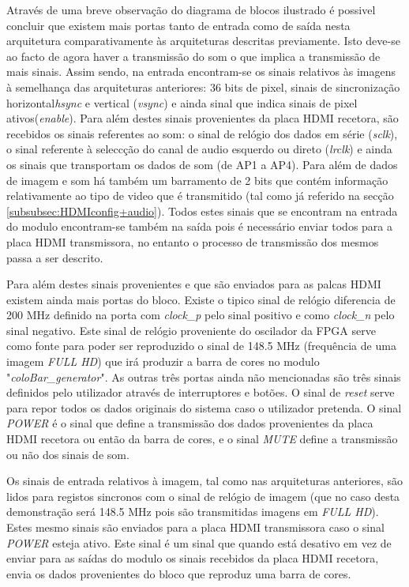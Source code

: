 Através de uma breve observação do diagrama de blocos ilustrado é possivel concluir que existem mais portas tanto de entrada como de saída nesta arquitetura comparativamente às arquiteturas descritas previamente. Isto deve-se ao facto de agora haver a transmissão do som o que implica a transmissão de mais sinais. Assim sendo, na entrada encontram-se os sinais relativos às imagens à semelhança das arquiteturas anteriores: 36 bits de pixel, sinais de sincronização horizontal\textit{hsync} e vertical (\textit{vsync}) e ainda sinal que indica sinais de pixel ativos(\textit{enable}). Para além destes sinais provenientes da placa HDMI recetora, são recebidos os sinais referentes ao som: o sinal de relógio dos dados em série (\textit{sclk}), o sinal referente à seleccção do canal de audio esquerdo ou direto (\textit{lrclk}) e ainda os sinais que transportam os dados de som (de AP1 a AP4). Para além de dados de imagem e som há também um barramento de 2 bits que contém informação relativamente ao tipo de video que é transmitido (tal como já referido na secção \ref{subsubsec:HDMIconfig+audio}). Todos estes sinais que se encontram na entrada do modulo encontram-se também na saída pois é necessário enviar todos para a placa HDMI transmissora, no entanto o processo de transmissão dos mesmos passa a ser descrito.

Para além destes sinais provenientes e que são enviados para as palcas HDMI existem ainda mais portas do bloco. Existe o tipico sinal de relógio diferencia de 200 MHz definido na porta com \textit{clock\_p} pelo sinal positivo e como \textit{clock\_n} pelo sinal negativo. Este sinal de relógio proveniente do oscilador da FPGA serve como fonte para poder ser reproduzido o sinal de 148.5 MHz (frequência de uma imagem \textit{FULL HD}) que irá produzir a barra de cores no modulo "\textit{coloBar\_generator}". As outras três portas ainda não mencionadas são três sinais definidos pelo utilizador através de interruptores e botões. O sinal de \textit{reset} serve para repor todos os dados originais do sistema caso o utilizador pretenda. O sinal \textit{POWER} é o sinal que define a transmissão dos dados provenientes da placa HDMI recetora ou então da barra de cores, e o sinal \textit{MUTE} define a transmissão ou não dos sinais de som.


Os sinais de entrada relativos à imagem, tal como nas arquiteturas anteriores, são lidos para registos sincronos com o sinal de relógio de imagem (que no caso desta demonstração será 148.5 MHz pois são transmitidas imagens em \textit{FULL HD}). Estes mesmo sinais são enviados para a placa HDMI transmissora caso o sinal \textit{POWER} esteja ativo. Este sinal é um sinal que quando está desativo em vez de enviar para as saídas do modulo os sinais recebidos da placa HDMI recetora, envia os dados provenientes do bloco que reproduz uma barra de cores.

